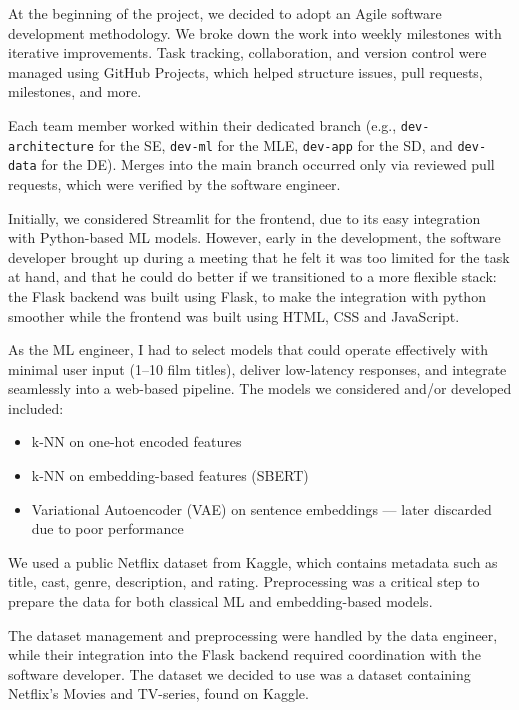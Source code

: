 \documentclass{article}
\begin{document}
At the beginning of the project, we decided to adopt an Agile software development methodology. We broke down the work into weekly milestones with iterative improvements. 
Task tracking, collaboration, and version control were managed using GitHub Projects, which helped structure issues, pull requests, milestones, and more.

Each team member worked within their dedicated branch (e.g., \texttt{dev-architecture} for the SE, \texttt{dev-ml} for the MLE, \texttt{dev-app} for the SD, and \texttt{dev-data} for the DE). Merges into the main branch occurred only via reviewed pull requests, which were verified by the software engineer.

Initially, we considered Streamlit for the frontend, due to its easy integration with Python-based ML models. 
However, early in the development, the software developer brought up during a meeting that he felt it was too limited for the task at hand, and that he could do better if we transitioned to a more flexible stack: the Flask backend was built using Flask, to make the integration with python smoother while the frontend was built using HTML, CSS and JavaScript.

As the ML engineer, I had to select models that could operate effectively with minimal user input (1–10 film titles), deliver low-latency responses, and integrate seamlessly into a web-based pipeline. The models we considered and/or developed included:
\begin{itemize}
  \item k-NN on one-hot encoded features
  \item k-NN on embedding-based features (SBERT)
  \item Variational Autoencoder (VAE) on sentence embeddings — later discarded due to poor performance
\end{itemize}


We used a public Netflix dataset from Kaggle, which contains metadata such as title, cast, genre, description, and rating. Preprocessing was a critical step to prepare the data for both classical ML and embedding-based models.

The dataset management and preprocessing were handled by the data engineer, while their integration into the Flask backend required coordination with the software developer. The dataset we decided to use was a dataset containing Netflix’s Movies and TV-series, found on Kaggle.




\end{document}
